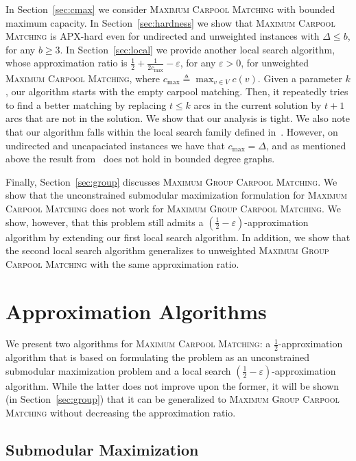 \documentclass[11pt]{article}
\newcommand{\eqdf}{\triangleq}
\newcommand{\half}{\frac{1}{2}}
\newcommand{\inv}[1]{\frac{1}{#1}}
\newcommand{\carpool}{\textsc{Maximum Carpool Matching}\xspace}
\newcommand{\gcp}{\textsc{Maximum Group Carpool Matching}\xspace}
\newcommand{\cmax}{c_{\max}}
\newcommand{\eps}{\varepsilon}
\begin{document}
In Section~\ref{sec:cmax} we consider \carpool with bounded maximum
capacity.   
%
In Section~\ref{sec:hardness} we show that \carpool is APX-hard even
for undirected and unweighted instances with $\Delta \leq b$, for any
$b \geq 3$.
%
In Section~\ref{sec:local} we provide another local search algorithm,
whose approximation ratio is $\half + \inv{2\cmax} - \eps$, for any
$\eps>0$, for unweighted \carpool, where $\cmax \eqdf \max_{v \in V}
c(v)$.  Given a parameter $k$, our algorithm starts with the empty
carpool matching.  Then, it repeatedly tries to find a better matching
by replacing $t \leq k$ arcs in the current solution by $t+1$ arcs
that are not in the solution.
%
We show that our analysis is tight.
%
We also note that our algorithm falls within the local search family
defined in~\cite{ACKK09}.  However, on undirected and uncapaciated
instances we have that $\cmax = \Delta$, and as mentioned above the
result from~\cite{ACKK09} does not hold in bounded degree graphs.

Finally, Section~\ref{sec:group} discusses \gcp.  We show that the
unconstrained submodular maximization formulation for \carpool does
not work for \gcp.  We show, however, that this problem still admits a
$(\frac{1}{2} -\varepsilon)$-approximation algorithm by extending our
first local search algorithm.  In addition, we show that the second
local search algorithm generalizes to unweighted \gcp with the same
approximation ratio.


\section{Approximation Algorithms}
\label{sec:approx}

We present two algorithms for \carpool: a $\frac{1}{2}$-approximation
algorithm that is based on formulating the problem as an unconstrained
submodular maximization problem and a local search $(\frac{1}{2} -
\varepsilon)$-approximation algorithm.  While the latter does not
improve upon the former, it will be shown (in Section~\ref{sec:group})
that it can be generalized to \gcp without decreasing the
approximation ratio.


\subsection{Submodular Maximization}
\label{sec:sub}
\end{document}
